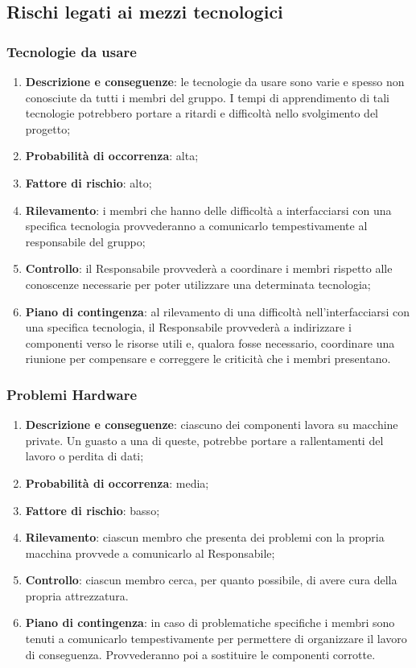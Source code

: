 \subsection{Rischi legati ai mezzi tecnologici}
	\subsubsection{Tecnologie da usare}		
	\begin{enumerate}
		\item \textbf{Descrizione e conseguenze}: le tecnologie da usare sono varie e spesso non conosciute da tutti i membri del gruppo. I tempi di apprendimento di tali tecnologie potrebbero portare a ritardi e difficoltà nello svolgimento del progetto;
		\item \textbf{Probabilità di occorrenza}: alta;
		\item \textbf{Fattore di rischio}: alto;
		\item \textbf{Rilevamento}: i membri che hanno delle difficoltà a interfacciarsi con una specifica tecnologia provvederanno a comunicarlo tempestivamente al responsabile del gruppo;
		\item \textbf{Controllo}: il Responsabile provvederà a coordinare i membri rispetto alle conoscenze necessarie per poter utilizzare una determinata tecnologia;  
		\item \textbf{Piano di contingenza}: al rilevamento di una difficoltà nell'interfacciarsi con una specifica tecnologia, il Responsabile provvederà a indirizzare i componenti verso le risorse utili e, qualora fosse necessario, coordinare una riunione per compensare e correggere le criticità che i membri presentano.
	\end{enumerate}	
	
	\subsubsection{Problemi Hardware}
	\begin{enumerate}
		\item \textbf{Descrizione e conseguenze}: ciascuno dei componenti lavora su macchine private. Un guasto a una di queste, potrebbe portare a rallentamenti del lavoro o perdita di dati;
		\item \textbf{Probabilità di occorrenza}: media;
		\item \textbf{Fattore di rischio}: basso;
		\item \textbf{Rilevamento}: ciascun membro che presenta dei problemi con la propria macchina provvede a comunicarlo al Responsabile;		
		\item \textbf{Controllo}: ciascun membro cerca, per quanto possibile, di avere cura della propria attrezzatura.
		\item \textbf{Piano di contingenza}: in caso di problematiche specifiche i membri sono tenuti a comunicarlo tempestivamente per permettere di organizzare il lavoro di conseguenza. Provvederanno poi a sostituire le componenti corrotte. 
	\end{enumerate}
	
